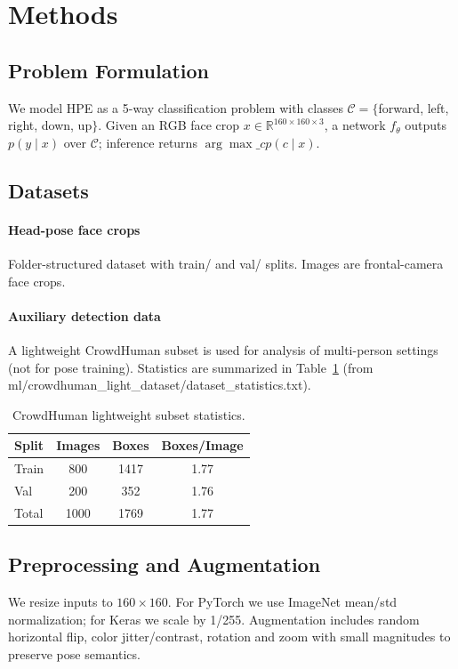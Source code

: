 \documentclass[11pt]{article}
\begin{document}
\section{Methods}
\subsection{Problem Formulation}
We model HPE as a 5-way classification problem with classes $\mathcal{C}=\{$forward, left, right, down, up$\}$. Given an RGB face crop $x\in\mathbb{R}^{160\times160\times3}$, a network $f_\theta$ outputs $p(y\mid x)$ over $\mathcal{C}$; inference returns $\arg\max\_c p(c\mid x)$.

\subsection{Datasets}
\paragraph{Head-pose face crops} Folder-structured dataset with train/ and val/ splits. Images are frontal-camera face crops.

\paragraph{Auxiliary detection data} A lightweight CrowdHuman subset is used for analysis of multi-person settings (not for pose training). Statistics are summarized in Table~\ref{tab:dataset-stats} (from ml/crowdhuman\_light\_dataset/dataset\_statistics.txt).

\begin{table}[h]
  \centering
  \caption{CrowdHuman lightweight subset statistics.}
  \label{tab:dataset-stats}
  \begin{tabular}{lccc}
    \toprule
    Split & Images & Boxes & Boxes/Image \\
    \midrule
    Train & 800 & 1417 & 1.77 \\
    Val & 200 & 352 & 1.76 \\
    \midrule
    Total & 1000 & 1769 & 1.77 \\
    \bottomrule
  \end{tabular}
\end{table}

\subsection{Preprocessing and Augmentation}
We resize inputs to $160\times160$. For PyTorch we use ImageNet mean/std normalization; for Keras we scale by 1/255. Augmentation includes random horizontal flip, color jitter/contrast, rotation and zoom with small magnitudes to preserve pose semantics.
\end{document}
